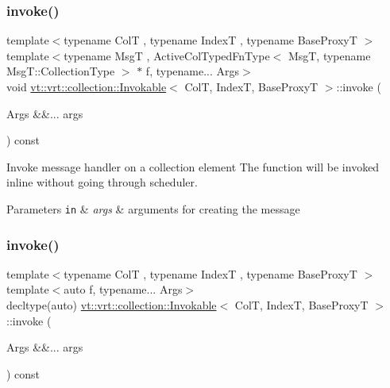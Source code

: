 \subsubsection{\texorpdfstring{invoke()}{invoke()}\hspace{0.1cm}{\footnotesize\ttfamily [2/3]}}
{\footnotesize\ttfamily template$<$typename ColT , typename IndexT , typename Base\+ProxyT $>$ \\
template$<$typename MsgT , Active\+Col\+Typed\+Fn\+Type$<$ Msg\+T, typename Msg\+T\+::\+Collection\+Type $>$ $\ast$ f, typename... Args$>$ \\
void \hyperlink{structvt_1_1vrt_1_1collection_1_1_invokable}{vt\+::vrt\+::collection\+::\+Invokable}$<$ ColT, IndexT, Base\+ProxyT $>$\+::invoke (\begin{DoxyParamCaption}\item[{Args \&\&...}]{args }\end{DoxyParamCaption}) const}



Invoke message handler on a collection element The function will be invoked inline without going through scheduler. 


\begin{DoxyParams}[1]{Parameters}
\mbox{\tt in}  & {\em args} & arguments for creating the message \\
\hline
\end{DoxyParams}
\mbox{\label{structvt_1_1vrt_1_1collection_1_1_invokable_a85b1cb97ede1b0652d4d994168fb0ede}} 
\subsubsection{\texorpdfstring{invoke()}{invoke()}\hspace{0.1cm}{\footnotesize\ttfamily [3/3]}}
{\footnotesize\ttfamily template$<$typename ColT , typename IndexT , typename Base\+ProxyT $>$ \\
template$<$auto f, typename... Args$>$ \\
decltype(auto) \hyperlink{structvt_1_1vrt_1_1collection_1_1_invokable}{vt\+::vrt\+::collection\+::\+Invokable}$<$ ColT, IndexT, Base\+ProxyT $>$\+::invoke (\begin{DoxyParamCaption}\item[{Args \&\&...}]{args }\end{DoxyParamCaption}) const}



